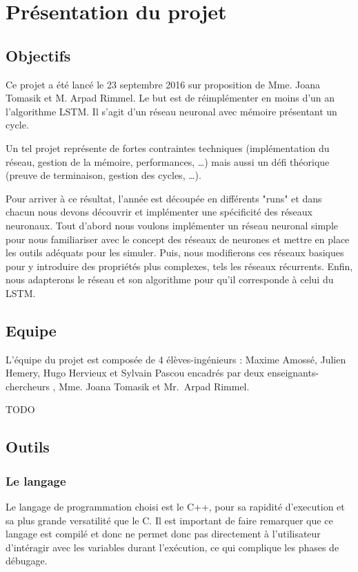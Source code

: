
\chapter{Présentation du projet}

\section{Objectifs}

Ce projet a été lancé le 23 septembre 2016 sur proposition de Mme. Joana Tomasik
 et M. Arpad Rimmel. Le but est de réimplémenter en moins d'un an l'algorithme
LSTM\footnotemark. Il s'agit d'un réseau neuronal avec mémoire présentant
un cycle.

\bigskip

Un tel projet représente de fortes contraintes techniques (implémentation du
réseau, gestion de la mémoire, performances, \ldots) mais aussi un défi théorique
(preuve de terminaison, gestion des cycles, \ldots).

\bigskip

Pour arriver à ce résultat, l'année est découpée en différents "runs" et dans
chacun nous devons découvrir et implémenter une spécificité des réseaux
neuronaux.
Tout d'abord nous voulons implémenter un réseau neuronal simple pour
nous familiariser avec le concept des réseaux de neurones et mettre en place
les outils adéquats pour les simuler. Puis, nous modifierons ces réseaux
basiques pour y introduire des propriétés plus complexes, tels les réseaux
récurrents. Enfin, nous adapterons le réseau et son algorithme pour qu'il
corresponde à celui du LSTM.

\section{Equipe}

L'équipe du projet est composée de 4 élèves-ingénieurs : Maxime Amossé, Julien
Hemery, Hugo Hervieux et Sylvain Pascou encadrés par deux enseignants-chercheurs
, Mme. Joana Tomasik et Mr.\ Arpad Rimmel.

TODO

\section{Outils}

\subsection{Le langage}
Le langage de programmation choisi est le C++, pour sa rapidité d'execution et
sa plus grande versatilité que le C. Il est important de faire remarquer que
ce langage est compilé et donc ne permet donc pas directement à l'utilisateur
d'intéragir avec les variables durant l'exécution, ce qui complique les phases
de débugage.

